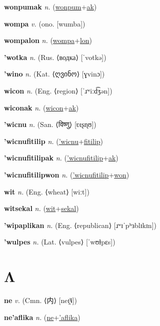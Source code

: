 \textbf{\hypertarget{wonpumak}{wonpumak}} \textit{n.} (\hyperlink{wonpum}{wonpum}+\allowbreak \hyperlink{ak}{ak})


\textbf{\hypertarget{wompa}{wompa}} \textit{v.} (ono. [wumba])


\textbf{\hypertarget{wompalon}{wompalon}} \textit{n.} (\hyperlink{wompa}{wompa}+\allowbreak \hyperlink{lon}{lon})


\textbf{\hypertarget{'wotka}{'wotka}} \textit{n.} (Rus. ⟨водка⟩ [ˈvotkə])


\textbf{\hypertarget{'wino}{'wino}} \textit{n.} (Kat. ⟨{\georgian{}ღვინო}⟩ [ɣvinɔ])


\textbf{\hypertarget{wicon}{wicon}} \textit{n.} (Eng. ⟨region⟩ [ˈɹʷiːd͡ʒən])


\textbf{\hypertarget{wiconak}{wiconak}} \textit{n.} (\hyperlink{wicon}{wicon}+\allowbreak \hyperlink{ak}{ak})


\textbf{\hypertarget{'wicnu}{'wicnu}} \textit{n.} (San. ⟨{\devanagari{}विष्णु}⟩ [ʋɪʂɳʊ])


\textbf{\hypertarget{'wicnufitilip}{'wicnufitilip}} \textit{n.} (\hyperlink{'wicnu}{'wicnu}+\allowbreak \hyperlink{fitilip}{fitilip})


\textbf{\hypertarget{'wicnufitilipak}{'wicnufitilipak}} \textit{n.} (\hyperlink{'wicnufitilip}{'wicnufitilip}+\allowbreak \hyperlink{ak}{ak})


\textbf{\hypertarget{'wicnufitilipwon}{'wicnufitilipwon}} \textit{n.} (\hyperlink{'wicnufitilip}{'wicnufitilip}+\allowbreak \hyperlink{won}{won})


\textbf{\hypertarget{wit}{wit}} \textit{n.} (Eng. ⟨wheat⟩ [wiːt])


\textbf{\hypertarget{witsekal}{witsekal}} \textit{n.} (\hyperlink{wit}{wit}+\allowbreak \hyperlink{sekal}{sekal})


\textbf{\hypertarget{'wipaplikan}{'wipaplikan}} \textit{n.} (Eng. ⟨republican⟩ [ɹʷɪˈpʰɜblɪkɪn])


\textbf{\hypertarget{'wulpes}{'wulpes}} \textit{n.} (Lat. ⟨vulpes⟩ [ˈwʊɫpɛs])


\section{Λ}

\textbf{\hypertarget{ne}{ne}} \textit{v.} (Cmn. ⟨{\chinese{}内}⟩ [neɪ̯˥˩])


\textbf{\hypertarget{ne'aflika}{ne'aflika}} \textit{n.} (\hyperlink{ne}{ne}+\allowbreak \hyperlink{'aflika}{'aflika})



